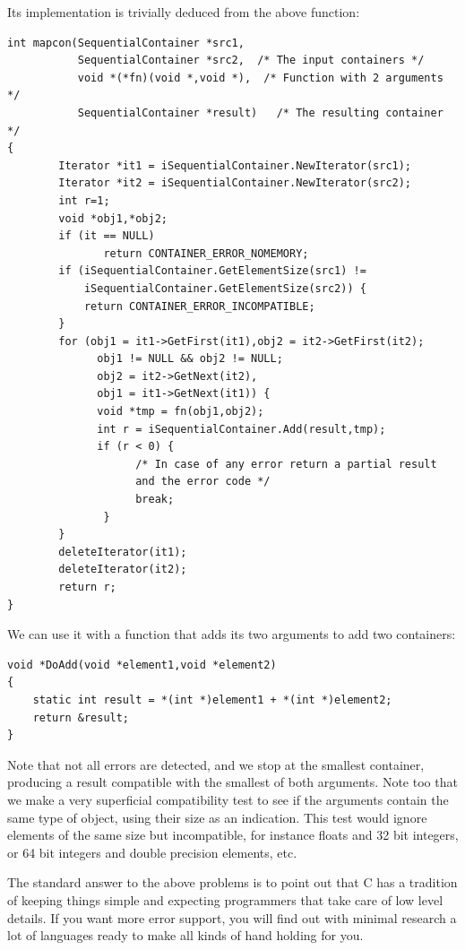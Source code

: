 \documentclass[12pt,a4paper]{memoir} %
\begin{document}
{{Its implementation is trivially deduced from the above function:
\begin{verbatim}
int mapcon(SequentialContainer *src1,
           SequentialContainer *src2,  /* The input containers */
           void *(*fn)(void *,void *),  /* Function with 2 arguments */
           SequentialContainer *result)   /* The resulting container */
{
        Iterator *it1 = iSequentialContainer.NewIterator(src1);
        Iterator *it2 = iSequentialContainer.NewIterator(src2);
        int r=1;
        void *obj1,*obj2;
        if (it == NULL)
               return CONTAINER_ERROR_NOMEMORY;
        if (iSequentialContainer.GetElementSize(src1) != 
            iSequentialContainer.GetElementSize(src2)) {
            return CONTAINER_ERROR_INCOMPATIBLE;
        }
        for (obj1 = it1->GetFirst(it1),obj2 = it2->GetFirst(it2);
              obj1 != NULL && obj2 != NULL;
              obj2 = it2->GetNext(it2),
              obj1 = it1->GetNext(it1)) {
              void *tmp = fn(obj1,obj2);
              int r = iSequentialContainer.Add(result,tmp);
              if (r < 0) {
                    /* In case of any error return a partial result 
                    and the error code */
                    break;
               }
        }
        deleteIterator(it1);
        deleteIterator(it2);
        return r;
}
\end{verbatim}
We can use it with a function  that adds its two arguments to add two containers:
\begin{verbatim}
void *DoAdd(void *element1,void *element2)
{
    static int result = *(int *)element1 + *(int *)element2;
    return &result;
}
\end{verbatim}
Note that not all errors are detected, and we stop at the smallest container, producing a result compatible with the smallest of both arguments.
Note too that we make a very superficial compatibility test to see if the arguments contain the same type of object, using their size as an indication. This test would ignore elements of the same size but incompatible, for instance floats and 32 bit integers, or 64 bit integers and double precision elements, etc.

The standard answer to the above problems is to point out that C has a tradition of keeping things simple and expecting programmers that take care of low level details. If you want more error support, you will find out with minimal research a lot of languages ready to make all kinds of hand holding for you.


}}
\end{document}
